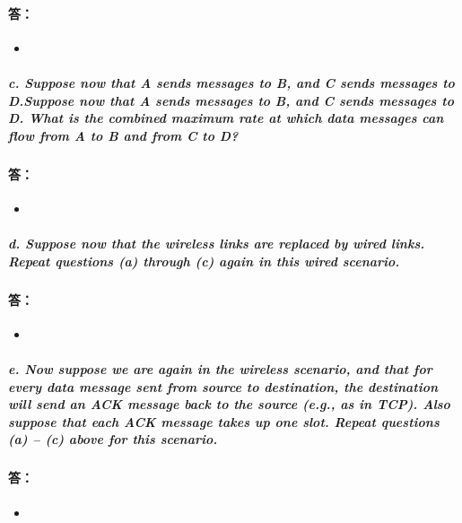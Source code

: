 \documentclass[a4paper]{ctexart}
\begin{document}
\paragraph*{答：} 
\begin{itemize}
    \item 
\end{itemize}
\subparagraph*{c. Suppose now that A sends messages to B, and C sends messages to D.Suppose now that A sends messages to B, and C sends messages to D.
What is the combined maximum rate at which data messages can flow from A to B and from C to D?}
\paragraph*{答：} 
\begin{itemize}
    \item 
\end{itemize}
\subparagraph*{d. Suppose now that the wireless links are replaced by wired links. Repeat questions (a) through (c) again in this wired scenario.}
\paragraph*{答：} 
\begin{itemize}
    \item 
\end{itemize}
\subparagraph*{e. Now suppose we are again in the wireless scenario, and that for every data message sent from source to destination, the destination will send an ACK message back to the source (e.g., as in TCP). Also suppose that each ACK message takes up one slot. Repeat questions (a) – (c) above for this scenario.} 
\paragraph*{答：} 
\begin{itemize}
    \item 
\end{itemize}
\end{document}
